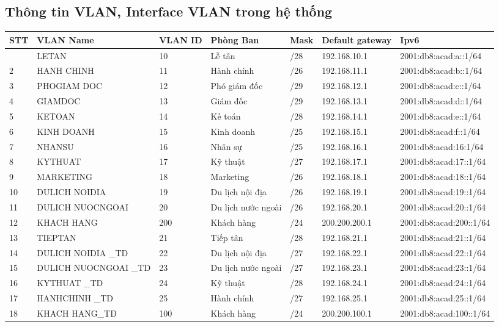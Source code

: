 \documentclass[a4paper, 12pt]{article}
\begin{document}
\subsection{Thông tin VLAN, Interface VLAN trong hệ thống}
\begin{center}
\def\arraystretch{2.1}\begin{longtable}{|p{}|p{}|p{}|p{}|p{}|p{}|p{}|}


\hline \textbf{STT } &  \textbf{VLAN Name } &  \textbf{VLAN ID } &  \textbf{Phòng Ban } &  \textbf{Mask} &  \textbf{Default gateway } &  \textbf{Ipv6} \\ \hline
\endfirsthead


\endhead


\endfoot


\endlastfoot

\hline 1 &	LETAN&	10&	Lễ tân&	/28&	192.168.10.1&	2001:db8:acad:a::1/64 \\
\hline 2 &	HANH CHINH&	11&	Hành chính&	/26&	192.168.11.1&	2001:db8:acad:b::1/64\\
\hline 3 &	PHOGIAM DOC&	12&	Phó giám đốc&	/29&	192.168.12.1&	2001:db8:acad:c::1/64\\
\hline 4 &	GIAMDOC&	13&	Giám đốc&	/29&	192.168.13.1&	2001:db8:acad:d::1/64\\
\hline 5 &	KETOAN&	14&	Kế toán&	/28&	192.168.14.1&	2001:db8:acad:e::1/64\\
\hline 6 &	KINH DOANH&	15&	Kinh doanh&	/25&	192.168.15.1&	2001:db8:acad:f::1/64\\
\hline 7 &	NHANSU &	16&	Nhân sự&	/25&	192.168.16.1&	2001:db8:acad:16:1/64\\
\hline 8 &	KYTHUAT&	17&	Kỹ thuật&	/27&	192.168.17.1&	2001:db8:acad:17::1/64\\
\hline 9 &	MARKETING&	18&	Marketing&	/26&	192.168.18.1&	2001:db8:acad:18::1/64\\
\hline 10 &	DULICH NOIDIA&	19&	Du lịch nội địa&	/26&	192.168.19.1&	2001:db8:acad:19::1/64\\
\hline 11 &	DULICH NUOCNGOAI&	20&	Du lịch nước ngoài&	/26&	192.168.20.1&	2001:db8:acad:20::1/64\\
\hline 12 &	KHACH HANG&	200&	Khách hàng&	/24&	200.200.200.1&	2001:db8:acad:200::1/64\\
\hline 13 &	TIEPTAN&	21&	Tiếp tân&	/28&	192.168.21.1&	2001:db8:acad:21::1/64\\
\hline 14 &	DULICH NOIDIA \_TD&	22&	Du lịch nội địa&	/27&	192.168.22.1&	2001:db8:acad:22::1/64\\
\hline 15 &	DULICH NUOCNGOAI \_TD&	23&	Du lịch nước ngoài&	/27&	192.168.23.1&	2001:db8:acad:23::1/64\\
\hline 16 &	KYTHUAT \_TD&	24&	Kỹ thuật&	/28&	192.168.24.1&	2001:db8:acad:24::1/64\\
\hline 17 &	HANHCHINH \_TD&	25&	Hành chính&	/27&	192.168.25.1&	2001:db8:acad:25::1/64\\
\hline 18 &	KHACH HANG\_TD&	100&	Khách hàng&	/24&	200.200.100.1&	2001:db8:acad:100::1/64\\
 

\end{longtable}
\end{center}
\end{document}
